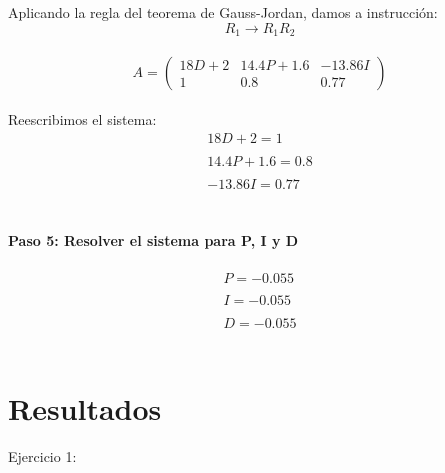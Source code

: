 \documentclass[12pt,letterpaper]{article}
\begin{document}
Aplicando la regla del teorema de Gauss-Jordan, damos a instrucción: \\ 

\begin{equation}R_{1} \rightarrow R_{1} R_{2}\end{equation} \\ 

\begin{equation}A =\left(\begin{array}{ccc}
18 D+2 & 14.4P+1.6 & -13.86I \\ 1 & 0.8 & 0.77
\end{array}\right)\end{equation} \\ 

Reescribimos el sistema: \\ 

\begin{equation}\begin{array}{l}
18 D+2=1 \\ \\ 
14.4P+1.6=0.8 \\ \\ 
-13.86 I=0.77
\end{array}\end{equation} \\ \\ 


\textbf{Paso 5: Resolver el sistema para P, I y D } \\ \\

\begin{equation}\begin{array}{l}
P= -0.055\\ \\ 
I= -0.055\\ \\ 
D= -0.055
\end{array}\end{equation} \\ 
 



\section{Resultados} 
\setcounter{equation}{0} %


Ejercicio 1: \\ \\  
\end{document}
